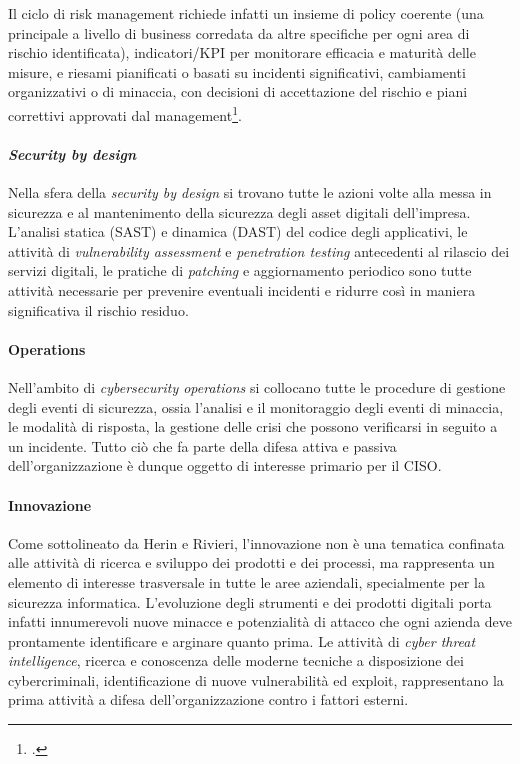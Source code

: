 Il ciclo di risk management richiede infatti un insieme di policy coerente (una principale a livello di business corredata da altre 
specifiche per ogni area di rischio identificata), indicatori/KPI per monitorare efficacia e maturità delle misure, e riesami pianificati o
basati su incidenti significativi, cambiamenti organizzativi o di minaccia, con
decisioni di accettazione del rischio e piani correttivi approvati dal management\footcite[pp. 9--15, pp. 21--25]{enisa-implementing-guidance}.

 \paragraph{\textit{Security by design}}
Nella sfera della \textit{security by design} si trovano tutte le azioni
volte alla messa in sicurezza e al mantenimento della sicurezza degli asset
digitali dell'impresa. L'analisi statica (SAST) e dinamica (DAST) del codice degli
applicativi, le attività di \textit{vulnerability assessment} e \textit{penetration testing}
antecedenti al rilascio dei servizi digitali, le pratiche di \textit{patching} e
aggiornamento periodico sono tutte attività necessarie per prevenire eventuali
incidenti e ridurre così in maniera significativa il rischio residuo.

\paragraph{Operations}
Nell'ambito di \textit{cybersecurity operations} si collocano tutte le procedure
di gestione degli eventi di sicurezza, ossia l'analisi e il monitoraggio degli eventi 
di minaccia, le modalità di risposta, la gestione delle crisi che possono verificarsi
in seguito a un incidente. Tutto ciò che fa parte della difesa attiva e passiva
dell'organizzazione è dunque oggetto di interesse primario per il CISO.

\paragraph{Innovazione}
Come sottolineato da Herin e Rivieri, l'innovazione non è una tematica confinata alle attività
di ricerca e sviluppo dei prodotti e dei processi, ma rappresenta un elemento di
interesse trasversale in tutte le aree aziendali, specialmente per la sicurezza
informatica. L'evoluzione degli strumenti e dei prodotti digitali porta infatti
innumerevoli nuove minacce e potenzialità di attacco che ogni azienda deve prontamente
identificare e arginare quanto prima. Le attività di \textit{cyber threat intelligence},
ricerca e conoscenza delle moderne tecniche a disposizione dei cybercriminali, 
identificazione di nuove vulnerabilità ed exploit, rappresentano la prima attività
a difesa dell'organizzazione contro i fattori esterni.


